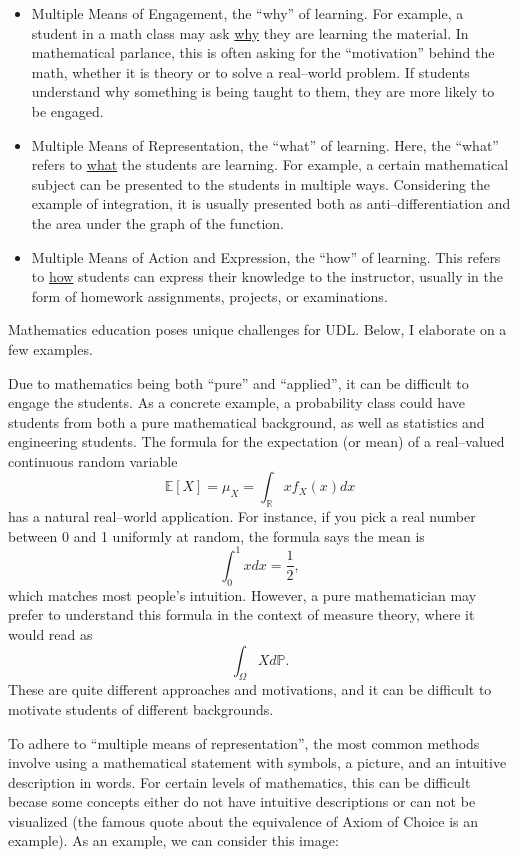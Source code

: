 \documentclass{ximera}
\begin{document}
\begin{itemize}
\item Multiple Means of Engagement, the “why” of learning. For example, a student in a math class may ask \underline{why} they are learning the material.
In mathematical parlance, this is often asking for the ``motivation'' behind the math, whether it is theory or to solve a real--world problem.
If students understand why something is being taught to them, they are more likely to be engaged. 
\item Multiple Means of Representation, the “what” of learning. Here, the ``what'' refers to \underline{what} the students are learning. For example, a certain mathematical subject can be presented to the
students in multiple ways. Considering the example of integration, it is usually presented both as anti--differentiation and the area under the graph of
the function. 
\item Multiple Means of Action and Expression, the “how” of learning. This refers to \underline{how} students can express their knowledge to the
instructor, usually in the form of homework assignments, projects, or examinations. 
\end{itemize}

Mathematics education poses unique challenges for UDL. Below, I elaborate on a few examples. 


Due to mathematics being both ``pure'' and ``applied'', it can be difficult to engage the students. As a concrete example, a probability class
could have students from both a pure mathematical background, as well as statistics and engineering students. The formula for the expectation
(or mean) of a real--valued continuous random variable
\[
\mathbb{E}[X] = \mu_X = \int_{\mathbb{R}} x f_X(x)dx
\]
has a natural real--world application. For instance, if you pick a real number between 0 and 1 uniformly at random, the formula says the mean is
\[
\int_0^1 xdx = \frac{1}{2},
\]
which matches most people's intuition. However, a pure mathematician may prefer to understand this formula in the context of measure theory, where it would 
read as
\[
\int_{\Omega} X d\mathbb{P}. 
\]
These are quite different approaches and motivations, and it can be difficult to motivate students of different backgrounds. 

To adhere to ``multiple means of representation'', the most common methods involve using a mathematical statement with symbols, a picture, and an intuitive
description in words. For certain levels of mathematics, this can be difficult becase some concepts either do not have intuitive descriptions or can not
be visualized (the famous quote about the equivalence of Axiom of Choice is an example). As an example, we can consider this image:
\end{document}
